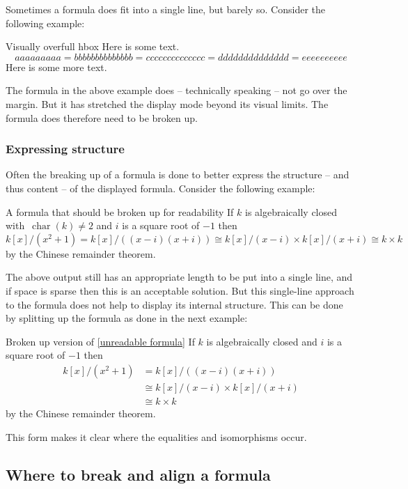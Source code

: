 Sometimes a formula does fit into a single line, but barely so.
Consider the following example:
\begin{showlatex}{Visually overfull hbox}
Here is some text.
\[
  aaaaaaaaa = bbbbbbbbbbbbbb = cccccccccccccc = dddddddddddddd = eeeeeeeeee
\]
Here is some more text.
\end{showlatex}
The formula in the above example does -- technically speaking -- not go over the margin.
But it has stretched the display mode beyond its visual limits.
The formula does therefore need to be broken up.

\subsubsection{Expressing structure}

Often the breaking up of a formula is done to better express the structure -- and thus content -- of the displayed formula.
Consider the following example:
\begin{showlatex}[label={unreadable formula}]{A formula that should be broken up for readability}
If $k$ is algebraically closed with~$\operatorname{char}(k) \neq 2$ and $i$ is a square root of $-1$ then
\[
  k[x]/(x^2 + 1)
  =
  k[x]/( (x - i) (x + i) )
  \cong
  k[x]/(x - i) \times k[x]/(x + i)
  \cong
  k \times k
\]
by the Chinese remainder theorem.
\end{showlatex}
The above output still has an appropriate length to be put into a single line, and if space is sparse then this is an acceptable solution.
But this single-line approach to the formula does not help to display its internal structure.
This can be done by splitting up the formula as done in the next example:
\begin{showlatex}{Broken up version of \cref*{unreadable formula}}
If $k$ is algebraically closed and $i$ is a square root of $-1$ then
\begin{align*}
  k[x]/(x^2 + 1)
  &=
  k[x]/( (x - i) (x + i) )
  \\
  &\cong
  k[x]/(x - i) \times k[x]/(x + i)
  \\
  &\cong
  k \times k
\end{align*}
by the Chinese remainder theorem.
\end{showlatex}
This form makes it clear where the equalities and isomorphisms occur.



\subsection{Where to break and align a formula}

